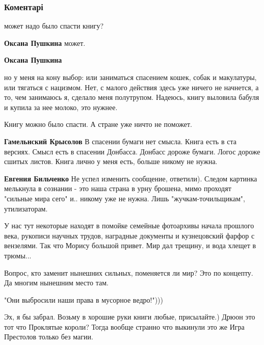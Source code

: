  
 
 
 
 
\subsubsection{Коментарі}
\label{sec:19_10_2021.fb.bilchenko_evgenia.3.moris_drjuon_kniga_musorka.cmt}

\begin{itemize} %
может надо было спасти книгу?

\begin{itemize} %
\textbf{Оксана Пушкина} может.

\textbf{Оксана Пушкина} 

но у меня на кону выбор: или заниматься спасением кошек, собак и макулатуры,
или тягаться с нацизмом. Нет, с малого действия здесь уже ничего не начнется, а
то, чем занимаюсь я, сделало меня полутрупом. Надеюсь, книгу выловила бабуля и
купила за нее молоко, это нужнее.

\end{itemize} %

Книгу можно было спасти. А стране уже ничто не поможет.

\begin{itemize} %
\textbf{Гамельнский Крысолов} В спасении бумаги нет смысла. Книга есть в ста версиях. Смысл есть в спасении Донбасса. Донбасс дороже бумаги. Логос дороже сшитых листов. Книга лично у меня есть, больше никому не нужна.

\textbf{Евгения Бильченко} Не успел изменить сообщение, ответили).
Следом картинка мелькнула в сознании - это наша страна в урну брошена, мимо проходят "сильные мира сего" и.. никому уже не нужна. Лишь "жучкам-точильщикам", утилизаторам.
\end{itemize} %


У нас тут некоторые находят в помойке семейные фотоархивы начала прошлого века,
рукописи научных трудов, наградные документы и кузнецовский фарфор с вензелями.
Так что Морису большой привет. Мир дал трещину, и вода хлещет в трюмы...


Вопрос, кто заменит нынешних сильных, поменяется ли мир? Это по концепту. Да
многим нынешним место там.


"Они выбросили наши права в мусорное ведро!")))


Эх, я бы забрал. Возьму в хорошие руки книги любые, присылайте.) Дрюон это тот
что Проклятые короли? Тогда вообще странно что выкинули это же Игра Престолов
только без магии.


\end{itemize} %
